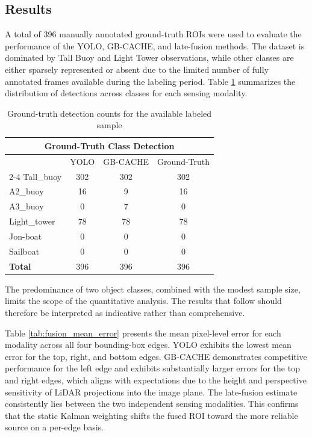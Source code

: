 \documentclass{erauthesis}
\begin{document}
\subsection{Results} \label{fusion_results}

A total of 396 manually annotated ground-truth ROIs were used to evaluate the performance of the YOLO, GB-CACHE, and late-fusion methods. 
The dataset is dominated by Tall Buoy and Light Tower observations, while other classes are either sparsely represented or absent due to the limited number of fully annotated frames available during the labeling period. 
Table \ref{tab:gt-detect} summarizes the distribution of detections across classes for each sensing modality.


\begin{table}[htpb]
\centering
\begin{tabular}{lccc}
\hline
\multicolumn{4}{c}{Ground-Truth Class Detection}\\
\hline
\hline
            & YOLO & GB-CACHE & Ground-Truth \\ \cline{2-4} 
Tall\_buoy   & 302  & 302      & 302          \\
A2\_buoy     & 16   & 9        & 16           \\
A3\_buoy     & 0    & 7        & 0            \\
Light\_tower & 78   & 78       & 78           \\
Jon-boat    & 0    & 0        & 0            \\
Sailboat    & 0    & 0        & 0            \\
\hline
\textbf{Total}       & 396  & 396      & 396      \\
\hline
\end{tabular}
\caption{Ground-truth detection counts for the available labeled sample}
\label{tab:gt-detect}
\end{table}

The predominance of two object classes, combined with the modest sample size, limits the scope of the quantitative analysis. 
The results that follow should therefore be interpreted as indicative rather than comprehensive.


Table \ref{tab:fusion_mean_error} presents the mean pixel-level error for each modality across all four bounding-box edges. YOLO exhibits the lowest mean error for the top, right, and bottom edges. GB-CACHE demonstrates competitive performance for the left edge and exhibits substantially larger errors for the top and right edges, which aligns with expectations due to the height and perspective sensitivity of LiDAR projections into the image plane. The late-fusion estimate consistently lies between the two independent sensing modalities. This confirms that the static Kalman weighting shifts the fused ROI toward the more reliable source on a per-edge basis.
\end{document}
